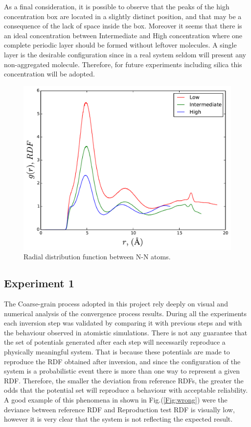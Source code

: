 \documentclass[10pt,a4paper,twoside]{article}
\begin{document}
As a final consideration, it is possible to observe that the peaks of the high concentration box are located in a slightly distinct position, and that may be a consequence of the lack of space inside the box. Moreover it seems that there is an ideal concentration between Intermediate and High concentration where one complete periodic layer should be formed without leftover molecules. A single layer is the desirable configuration since in a real system seldom will present any non-aggregated molecule. Therefore, for future experiments including silica this concentration will be adopted.
\begin{figure}[H]
  \begin{center}
	\includegraphics[width=0.8 \textwidth]{./graphs/rdfAA}
	\caption{Radial distribution function between N-N atoms. }
	\label{Fig:rdfAA}
  \end{center}
\end{figure}
\subsection{Experiment 1}

The Coarse-grain process adopted in this project rely deeply on visual and numerical analysis of the convergence process results. During all the experiments each inversion step was validated by comparing it with previous steps and with the behaviour observed in atomistic simulations. There is not any guarantee that the set of potentials generated after each step will necessarily reproduce a physically meaningful system.  That is because these potentials are made to reproduce the RDF obtained after inversion, and since the configuration of the system is a probabilistic event there is more than one way to represent a given RDF. Therefore, the smaller the deviation from reference RDFs, the greater the odds that the potential set will reproduce a behaviour with acceptable reliability. A good example of this phenomena in shown in Fig.(\ref{Fig:wrong}) were the deviance between reference RDF and Reproduction test RDF is visually low, however it is very clear that the system is not reflecting the expected result.
\end{document}
